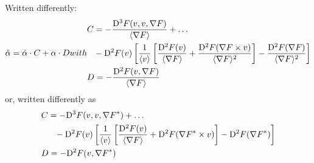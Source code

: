 Written differently:
\begin{subequations}
    \begin{align}
        \ddot{ \alpha }   =   \dot{ \alpha } \mult C  +  \alpha \mult D
    \end{align}
    with
    \begin{align}
        &\begin{aligned}
            C   &=
            - \frac{ \diff{3}{F}( v, v, \grad{F} ) }{ \skaq{\grad{F}} }  +  \dots \\
            &- \diff{2}{F}( v )
            \left[ \frac{ 1 }{ \skaq{v} }
            \left[ \frac{ \diff{2}{F}( v ) }{ \skaq{\grad{F}} }  +
            \frac{ \diff{2}{F}( \grad{F} \times v ) }{ \skaq{\grad{F}}^2 } \right]  -
            \frac{ \diff{2}{F}( \grad{F} ) }{ \skaq{\grad{F}}^2 } \right]
        \end{aligned}\\
        &D   =   - \frac{ \diff{2}{F}( v, \grad{F} ) }{ \skaq{\grad{F}} }
    \end{align}
\end{subequations}
or, written differently as
\begin{subequations}
    \begin{align}
        &\begin{aligned}
            C   &=
            - \mathrm{D}^{ 3 }F( v, v, {\nabla F}^* )  +  \dots \\
            &\hphantom{=}-\mathrm{D}^{ 2 }F( v )
            \left[ \frac{ 1 }{ \langle v \rangle }
            \left[ \frac{ \mathrm{D}^{ 2 }F( v ) }{ \langle \nabla F \rangle }  +
            \mathrm{D}^{ 2 }F( {\nabla F}^* \times v ) \right]  -
            \mathrm{D}^{ 2 }F( {\nabla F}^* ) \right]
        \end{aligned}\\
        &D   =   - \mathrm{D}^{ 2 }F( v, {\nabla F}^* )
    \end{align}
\end{subequations}



